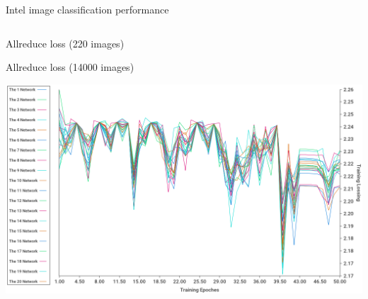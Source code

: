 \documentclass[presentation]{beamer}
\begin{document}
\begin{frame}[label={sec:orged96df4}]{Intel image classification performance}
\begin{columns}
\begin{column}{0.55\columnwidth}
\begin{block}{Allreduce loss (220 images)}
\begin{center}
\end{center}
Allreduce loss (14000 images)
\begin{center}
\includegraphics[width=.9\linewidth]{./png/intelImage_allreduce_loss.png}
\end{center}
\end{block}
\end{column}
\end{columns}
\end{frame}
\end{document}
